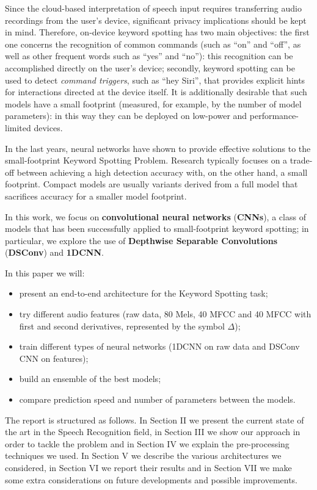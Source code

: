 \documentclass[conference]{IEEEtran}
\begin{document}
Since the cloud-based interpretation of speech input requires transferring audio recordings from the user’s device, significant privacy implications should be kept in mind. Therefore, on-device keyword spotting has two main objectives: the first one concerns the recognition of common commands (such as “on” and “off”, as well as other frequent words such as “yes” and “no”): this recognition can be accomplished directly on the user’s device; secondly, keyword spotting can be used to detect \textit{command triggers}, such as “hey Siri”, that provides explicit hints for interactions directed at the device itself. It is additionally desirable that such models have a small footprint (measured, for example, by the number of model parameters): in this way they can be deployed on low-power and performance-limited devices.

In the last years, neural networks have shown to provide effective solutions to the small-footprint Keyword Spotting Problem. Research typically focuses on a trade-off between achieving a high detection accuracy with, on the other hand, a small footprint. Compact models are usually variants derived from a full model that sacrifices accuracy for a smaller model footprint.

In this work, we focus on \textbf{convolutional neural networks} (\textbf{CNNs}), a class of models that has been successfully applied to small-footprint keyword spotting; in particular, we explore the use of \textbf{Depthwise Separable Convolutions} (\textbf{DSConv}) and \textbf{1DCNN}.

In this paper we will: 
\begin{itemize}
\setlength{\itemsep}{0pt}
  \setlength{\parskip}{0pt}
  \setlength{\parsep}{0pt}
\item present an end-to-end architecture for the Keyword Spotting task;
\item try different audio features (raw data, 80 Mels, 40 MFCC and 40 MFCC with first and second derivatives, represented by the symbol $\Delta$);
\item train different types of neural networks (1DCNN on raw data and DSConv CNN on features);
\item build an ensemble of the best models;
\item compare prediction speed and number of parameters between the models.
\end{itemize}

The report is structured as follows. In Section II we present the current state of the art in the Speech Recognition field, in Section III we show our approach in order to tackle the problem and in Section IV we explain the pre-processing techniques we used. In Section V we describe the various architectures we considered, in Section VI we report their results and in Section VII we make some extra considerations on future developments and possible improvements.
\end{document}
